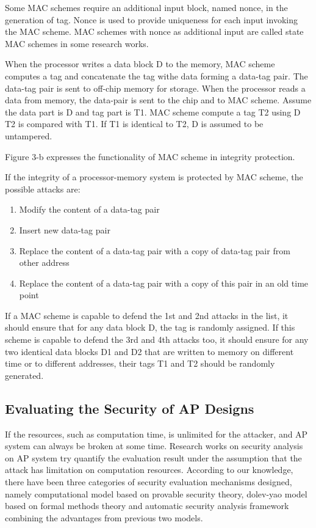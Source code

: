\documentclass{article}
\begin{document}
Some MAC schemes require an additional input block, named nonce, in the generation of tag. Nonce is used to provide uniqueness for each input invoking the MAC scheme. MAC schemes with nonce as additional input are called state MAC schemes in some research works.

When the processor writes a data block D to the memory, MAC scheme computes a tag  and concatenate the tag withe data forming a data-tag pair. The data-tag pair is sent to off-chip memory for storage.
When the processor reads a data from memory, the data-pair is sent to the chip and to MAC scheme. Assume the data part is D and tag part is T1. MAC scheme compute a tag T2 using D T2 is compared with T1. If T1 is identical to T2, D is assumed to be untampered.
 
Figure 3-b expresses the functionality of MAC scheme in integrity protection.

If the integrity of a processor-memory system is protected by MAC scheme, the possible attacks are:
\begin{enumerate}
	\item Modify the content of a data-tag pair
	\item Insert new data-tag pair
	\item Replace the content of a data-tag pair with a copy of data-tag pair from other address
	\item Replace the content of a data-tag pair with a copy of this pair in an old time point
\end{enumerate}

If a MAC scheme is capable to defend the 1st and 2nd attacks in the list, it should ensure that for any data block D, the tag is randomly assigned. If this scheme is capable to defend the 3rd and 4th attacks too, it should ensure for any two identical data blocks D1 and D2 that are written to memory on different time or to different addresses, their tags T1 and T2 should be randomly generated.

\subsection{Evaluating the Security of AP Designs}
If the resources, such as computation time, is unlimited for the attacker, and AP system can always be broken at some time. Research works on security analysis on AP system try quantify the evaluation result under the assumption that the attack has limitation on computation resources. According to our knowledge, there have been three categories of security evaluation mechanisms designed, namely computational model based on provable security theory, dolev-yao model based on formal methods theory and automatic security analysis framework combining the advantages from previous two models.
\end{document}
